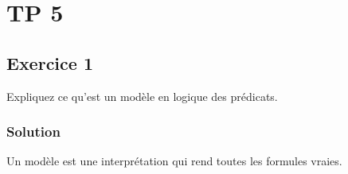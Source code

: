 \section{TP 5}








\subsection*{Exercice 1}
Expliquez ce qu'est un modèle en logique des prédicats. 

    \subsubsection*{Solution}
    
    Un modèle est une interprétation qui rend toutes les formules vraies.
    
